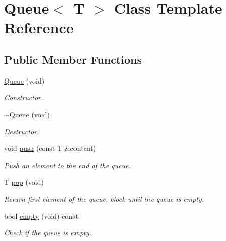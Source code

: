 \hypertarget{class_queue}{\section{Queue$<$ T $>$ Class Template Reference}
\label{class_queue}
}
\subsection*{Public Member Functions}
\begin{DoxyCompactItemize}
\item 
\hypertarget{class_queue_a9a8f3a867ee70dbf282f7d80a80f7618}{\hyperlink{class_queue_a9a8f3a867ee70dbf282f7d80a80f7618}{Queue} (void)}\label{class_queue_a9a8f3a867ee70dbf282f7d80a80f7618}

\begin{DoxyCompactList}\small\item\em Constructor. \end{DoxyCompactList}\item 
\hypertarget{class_queue_a674f985748042e4ee20587677916f6a7}{\hyperlink{class_queue_a674f985748042e4ee20587677916f6a7}{$\sim$\-Queue} (void)}\label{class_queue_a674f985748042e4ee20587677916f6a7}

\begin{DoxyCompactList}\small\item\em Destructor. \end{DoxyCompactList}\item 
void \hyperlink{class_queue_acb286d55b3b5b3ac32b33ca00d11d79b}{push} (const T \&content)
\begin{DoxyCompactList}\small\item\em Push an element to the end of the queue. \end{DoxyCompactList}\item 
T \hyperlink{class_queue_a2398b345833a6953f46d9103a987f86c}{pop} (void)
\begin{DoxyCompactList}\small\item\em Return first element of the queue, block until the queue is empty. \end{DoxyCompactList}\item 
bool \hyperlink{class_queue_a36daac3abaf524618772154055753901}{empty} (void) const 
\begin{DoxyCompactList}\small\item\em Check if the queue is empty. \end{DoxyCompactList}\end{DoxyCompactItemize}


